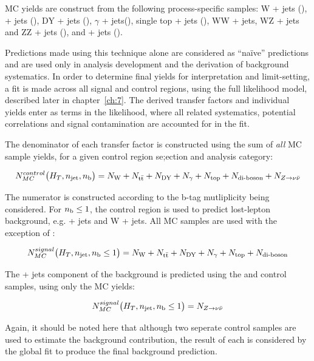 MC yields are construct from the following process-specific samples:
W + jets (\numw),
\ttbar + jets (\numtt), DY + jets (\numdy), $\gamma$ + jets(\numgam),
single top + jets (\numtop), WW + jets, WZ + jets and ZZ + jets (\numdibo), and
\zinv + jets (\numzinv).

Predictions made using this technique alone are considered as ``na\"{i}ve'' 
predictions and are used only in analysis development and the derivation of 
background systematics. In order to determine final yields for interpretation and 
limit-setting, a fit is made across all signal and control regions, using the 
full likelihood model, described later in chapter~\ref{ch:7}. The derived 
transfer factors and individual yields enter as terms in the likelihood, where 
all related systematics, potential correlations and signal contamination are
accounted for in the fit. 

The denominator of each transfer factor is constructed using the sum of
\textit{all} MC sample yields, for a given control region se;ection and
analysis category:

\begin{equation}
N_{MC}^{control}\big(H_T, n_{\text{jet}}, n_{\text{b}}\big) = N_{\text{W}} + N_{\text{t}\bar{\text{t}}} + N_{\text{DY}} + N_{\gamma} + 
N_{\text{top}} + N_{\text{di-boson}} + N_{Z \to \nu\bar{\nu}}
\label{eq:trans_fact_denom}
\end{equation}

The numerator is constructed according to the b-tag mutliplicity being 
considered. For $n_{\text{b}} \leq 1$, the \mj control region is used to predict 
lost-lepton background, e.g. \ttbar + jets and W + jets. All MC samples
are used with the exception of \zinv:

\begin{equation}
N_{MC}^{signal}\big(H_T, n_{\text{jet}}, n_{\text{b}} \leq 1\big) = N_{\text{W}} + N_{\text{t}\bar{\text{t}}} + N_{\text{DY}} + N_{\gamma} + 
N_{\text{top}} + N_{\text{di-boson}}
\label{eq:trans_fact_num_le1b_noz}
\end{equation}

The \zinv + jets component of the background is predicted using the \mmj
and \gj control samples, using only the \zinv MC yields:

\begin{equation}
N_{MC}^{signal}\big(H_T, n_{\text{jet}}, n_{\text{b}} \leq 1 \big) = N_{Z \to \nu\bar{\nu}}
\label{eq:trans_fact_num_le1b_z}
\end{equation}

Again, it should be noted here that although two seperate control samples are 
used to estimate the \zinv background contribution, the result of each is
considered by the global fit to produce the final background prediction.

